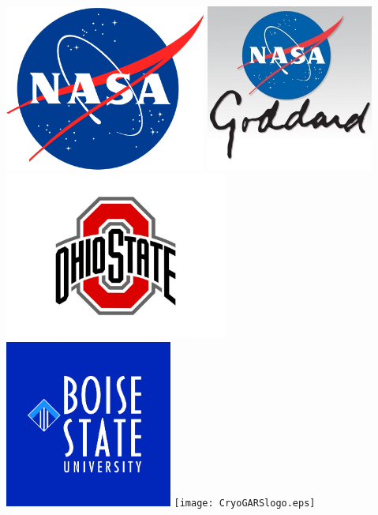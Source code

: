 \documentclass[landscape,a0b,final]{a0poster}
\begin{document}
{\begin{minipage}[c]{0.20\textwidth}
\begin{flushright}
\includegraphics[height=5.5cm]{NASA.pdf} \vspace{0.6cm} \includegraphics[height=5.5cm]{GSFC_logo.jpeg} \hspace{0.2cm} 
\includegraphics[height=5.5cm]{OSUlogo.jpeg} \\
\includegraphics[height=5.5cm]{BSU.png} \hspace{0.2cm} 
\texttt{[image: CryoGARSlogo.eps]} \\

\end{flushright}
\end{minipage}

}
\vspace{1cm}
\end{document}
